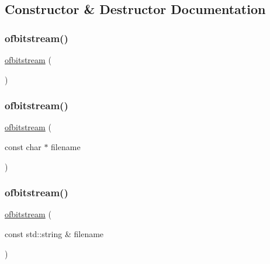 \subsection{Constructor \& Destructor Documentation}
\mbox{\label{classofbitstream_a17657aa7e766554cdfd08cbed37d02e4}} 
\subsubsection{\texorpdfstring{ofbitstream()}{ofbitstream()}\hspace{0.1cm}{\footnotesize\ttfamily [1/3]}}
{\footnotesize\ttfamily \mbox{\hyperlink{classofbitstream}{ofbitstream}} (\begin{DoxyParamCaption}{ }\end{DoxyParamCaption})}

\mbox{\label{classofbitstream_a4f24be0f7b8620034f41673c9121f87d}} 
\subsubsection{\texorpdfstring{ofbitstream()}{ofbitstream()}\hspace{0.1cm}{\footnotesize\ttfamily [2/3]}}
{\footnotesize\ttfamily \mbox{\hyperlink{classofbitstream}{ofbitstream}} (\begin{DoxyParamCaption}\item[{const char $\ast$}]{filename }\end{DoxyParamCaption})}

\mbox{\label{classofbitstream_a3743823306e8043638edf759f8864fab}} 
\subsubsection{\texorpdfstring{ofbitstream()}{ofbitstream()}\hspace{0.1cm}{\footnotesize\ttfamily [3/3]}}
{\footnotesize\ttfamily \mbox{\hyperlink{classofbitstream}{ofbitstream}} (\begin{DoxyParamCaption}\item[{const std\+::string \&}]{filename }\end{DoxyParamCaption})}



